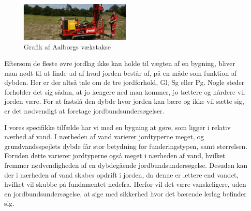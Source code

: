 \begin{figure}[H] 
\centering
\includegraphics[width=0.50\textwidth]{billeder/Jordbund1}
\caption{Grafik af Aalborgs vækstakse}
\label{fig:Jordbund1}
\end{figure}




Eftersom de fleste øvre jordlag ikke kan holde til vægten af en bygning, bliver man nødt til at finde ud af hvad jorden består af, på en måde som funktion af dybden. Her er der altså tale om de tre jordforhold, Gl, Sg eller Pg. Nogle steder forholder det sig sådan, at jo længere ned man kommer, jo tættere og hårdere vil jorden være. For at fastslå den dybde hvor jorden kan bære og ikke vil sætte sig, er det nødvendigt at foretage jordbundsundersøgelser. 

I vores specifikke tilfælde har vi med en bygning at gøre, som ligger i relativ nærhed af vand. I nærheden af vand varierer jordtyperne meget, og grundvandsspejlets dybde får stor betydning for funderingstypen, samt størrelsen. Foruden dette varierer jordtyperne også meget i nærheden af vand, hvilket fremmer nødvendigheden af en dybdegående jordbundsundersøgelse. Desuden kan der i nærheden af vand skabes opdrift i jorden, da denne er lettere end vandet, hvilket vil skubbe på fundamentet nedefra. Herfor vil det være vanskeligere, uden en jordbundsundersøgelse, at sige med sikkerhed hvor det bærende lerlag befinder sig.


